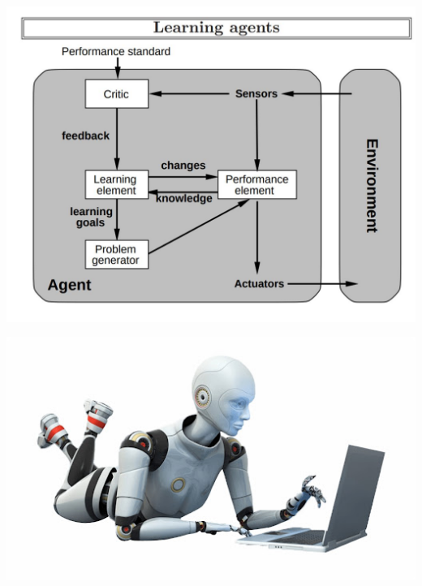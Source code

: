 \documentclass{beamer}
\begin{document}
	\begin{frame}
		\centering
		\includegraphics[scale=0.21]{a6.jpeg}
	\end{frame}

	\begin{frame}
		\includegraphics[scale=0.54]{ed.jpg}
	\end{frame}
\end{document}
